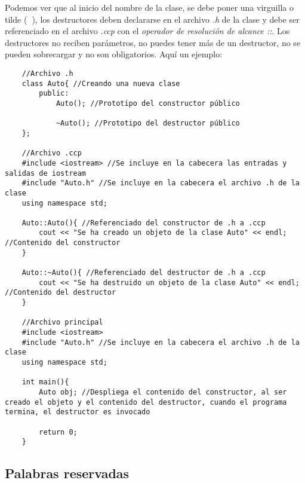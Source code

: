 Podemos ver que al inicio del nombre de la clase, se debe poner una virguilla o tilde (\textbf{~}), los destructores deben declararse en el archivo \textit{.h} de la clase y debe ser referenciado en el archivo \textit{.ccp} con el \textit{operador de resolución de alcance ::}. Los destructores no reciben parámetros, no puedes tener más de un destructor, no se pueden sobrecargar y no son obligatorios. Aquí un ejemplo:
\begin{lstlisting}
    //Archivo .h
    class Auto{ //Creando una nueva clase
        public:
            Auto(); //Prototipo del constructor público
            
            ~Auto(); //Prototipo del destructor público
    };
    
    //Archivo .ccp
    #include <iostream> //Se incluye en la cabecera las entradas y salidas de iostream
    #include "Auto.h" //Se incluye en la cabecera el archivo .h de la clase
    using namespace std;
    
    Auto::Auto(){ //Referenciado del constructor de .h a .ccp
        cout << "Se ha creado un objeto de la clase Auto" << endl; //Contenido del constructor
    }
    
    Auto::~Auto(){ //Referenciado del destructor de .h a .ccp
        cout << "Se ha destruido un objeto de la clase Auto" << endl; //Contenido del destructor
    }
    
    //Archivo principal
    #include <iostream>
    #include "Auto.h" //Se incluye en la cabecera el archivo .h de la clase
    using namespace std;
    
    int main(){
        Auto obj; //Despliega el contenido del constructor, al ser creado el objeto y el contenido del destructor, cuando el programa termina, el destructor es invocado
        
        return 0;
    }
\end{lstlisting}


\subsection{Palabras reservadas}


